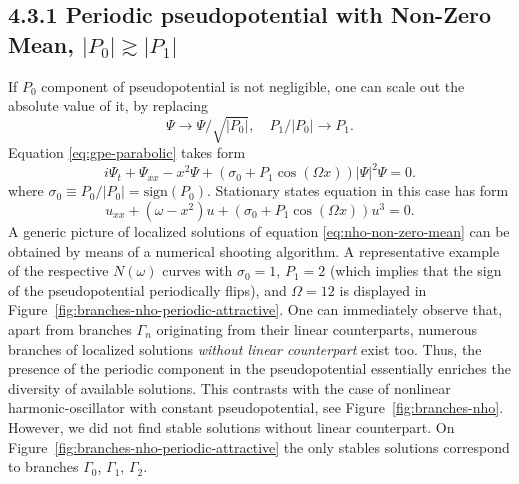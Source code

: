 \subsection*{4.3.1 Periodic pseudopotential with Non-Zero Mean, $|P_0| \gtrsim |P_1|$}

If $P_0$ component of pseudopotential is not negligible, one can scale out the absolute value of it, by replacing 
\begin{equation}
	\Psi \to \Psi / \sqrt{|P_0|}, \quad P_1 / |P_0| \to P_1.
\end{equation}
Equation \eqref{eq:gpe-parabolic} takes form
\begin{equation}
	i \Psi_t + \Psi_{xx} - x^2 \Psi + (\sigma_0 + P_1 \cos (\Omega x)) |\Psi|^2 \Psi = 0.
\label{eq:gpe-non-zero-mean}
\end{equation}
where $\sigma_0 \equiv P_0 / |P_0| = \mathrm{sign} (P_0)$.
Stationary states equation in this case has form
\begin{equation}
	u_{xx} + (\omega - x^2) u + (\sigma_0 + P_1 \cos (\Omega x)) u^3 = 0.
\label{eq:nho-non-zero-mean}
\end{equation}
A generic picture of localized solutions of equation \eqref{eq:nho-non-zero-mean} can be obtained by means of a numerical shooting algorithm.
A representative example of the respective $N(\omega)$ curves with $\sigma_0 = 1$, $P_1 = 2$ (which implies that the sign of the pseudopotential periodically flips), and $\Omega = 12$ is displayed in Figure~\ref{fig:branches-nho-periodic-attractive}.
One can immediately observe that, apart from branches $\Gamma_n$ originating from their linear counterparts, numerous branches of localized solutions {\it without linear counterpart} exist too.
Thus, the presence of the periodic component in the pseudopotential essentially enriches the diversity of available solutions.
This contrasts with the case of nonlinear harmonic-oscillator with constant pseudopotential, see Figure~\ref{fig:branches-nho}.
However, we did not find stable solutions without linear counterpart.
On Figure~\ref{fig:branches-nho-periodic-attractive} the only stables solutions correspond to branches $\Gamma_0$, $\Gamma_1$, $\Gamma_2$.

